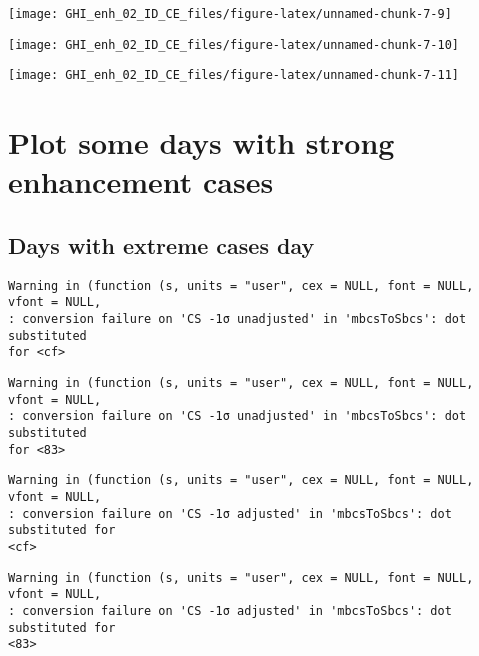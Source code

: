 \documentclass[
  10pt,
  a4paper,oneside]{article}
\begin{document}
\begin{center}\texttt{[image: GHI\_enh\_02\_ID\_CE\_files/figure-latex/unnamed-chunk-7-9]} \end{center}

\begin{center}\texttt{[image: GHI\_enh\_02\_ID\_CE\_files/figure-latex/unnamed-chunk-7-10]} \end{center}

\begin{center}\texttt{[image: GHI\_enh\_02\_ID\_CE\_files/figure-latex/unnamed-chunk-7-11]} \end{center}

\FloatBarrier

\hypertarget{plot-some-days-with-strong-enhancement-cases}{%
\section{Plot some days with strong enhancement cases}\label{plot-some-days-with-strong-enhancement-cases}}

\FloatBarrier

\hypertarget{days-with-extreme-cases-day}{%
\subsection{Days with extreme cases day}\label{days-with-extreme-cases-day}}

\begin{verbatim}
Warning in (function (s, units = "user", cex = NULL, font = NULL, vfont = NULL,
: conversion failure on 'CS -1σ unadjusted' in 'mbcsToSbcs': dot substituted
for <cf>
\end{verbatim}

\begin{verbatim}
Warning in (function (s, units = "user", cex = NULL, font = NULL, vfont = NULL,
: conversion failure on 'CS -1σ unadjusted' in 'mbcsToSbcs': dot substituted
for <83>
\end{verbatim}

\begin{verbatim}
Warning in (function (s, units = "user", cex = NULL, font = NULL, vfont = NULL,
: conversion failure on 'CS -1σ adjusted' in 'mbcsToSbcs': dot substituted for
<cf>
\end{verbatim}

\begin{verbatim}
Warning in (function (s, units = "user", cex = NULL, font = NULL, vfont = NULL,
: conversion failure on 'CS -1σ adjusted' in 'mbcsToSbcs': dot substituted for
<83>
\end{verbatim}
\end{document}

